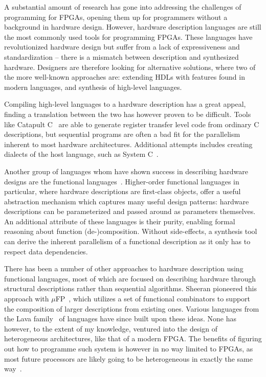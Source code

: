 A substantial amount of research has gone into addressing the challenges of programming for FPGAs, opening them up for programmers without a background in hardware design. However, hardware description languages are still the most commonly used tools for programming FPGAs. These languages have revolutionized hardware design but suffer from a lack of expressiveness and standardization -- there is a mismatch between description and synthesized hardware. Designers are therefore looking for alternative solutions, where two of the more well-known approaches are: extending HDLs with features found in modern languages, and synthesis of high-level languages.

Compiling high-level languages to a hardware description has a great appeal, finding a translation between the two has however proven to be difficult. Tools like Catapult C~\cite{graphics2008} are able to generate register transfer level code from ordinary C descriptions, but sequential programs are often a bad fit for the parallelism inherent to most hardware architectures. Additional attempts includes creating dialects of the host language, such as System C~\cite{ghenassia2005}.

Another group of languages whom have shown success in describing hardware designs are the functional languages~\cite{sheeran2005}. Higher-order functional languages in particular, where hardware descriptions are first-class objects, offer a useful abstraction mechanism which captures many useful design patterns: hardware descriptions can be parameterized and passed around as parameters themselves. An additional attribute of these languages is their purity, enabling formal reasoning about function (de-)composition. Without side-effects, a synthesis tool can derive the inherent parallelism of a functional description as it only has to respect data dependencies.

There has been a number of other approaches to hardware description using functional languages, most of which are focused on describing hardware through structural descriptions rather than sequential algorithms. Sheeran pioneered this approach with $\mu$FP~\cite{sheeran1984}, which utilizes a set of functional combinators to support the composition of larger descriptions from existing ones. Various languages from the Lava family~\cite{bjesse1998, gill2010} of languages have since built upon these ideas. None has however, to the extent of my knowledge, ventured into the design of heterogeneous architectures, like that of a modern FPGA. The benefits of figuring out how to programme such system is however in no way limited to FPGAs, as most future processors are likely going to be heterogeneous in exactly the same way~\cite{sheeran2015}.

